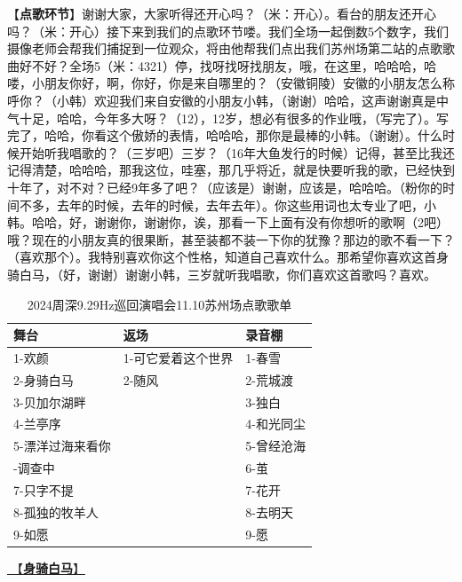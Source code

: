 \documentclass[]{ctexbook}
\begin{document}
【\textbf{点歌环节}】谢谢大家，大家听得还开心吗？（米：开心）。看台的朋友还开心吗？（米：开心）接下来到我们的点歌环节喽。我们全场一起倒数5个数字，我们摄像老师会帮我们捕捉到一位观众，将由他帮我们点出我们苏州场第二站的点歌歌曲好不好？全场5（米：4321）停，找呀找呀找朋友，哦，在这里，哈哈哈，哈喽，小朋友你好，啊，你好，你是来自哪里的？（安徽铜陵）安徽的小朋友怎么称呼你？（小韩）欢迎我们来自安徽的小朋友小韩，（谢谢）哈哈，这声谢谢真是中气十足，哈哈，今年多大呀？（12），12岁，想必有很多的作业哦，（写完了）。写完了，哈哈，你看这个傲娇的表情，哈哈哈，那你是最棒的小韩。（谢谢）。什么时候开始听我唱歌的？（三岁吧）三岁？（16年大鱼发行的时候）记得，甚至比我还记得清楚，哈哈哈，那我这位，哇塞，那几乎将近，就是快要听我的歌，已经快到十年了，对不对？已经9年多了吧？（应该是）谢谢，应该是，哈哈哈。（粉你的时间不多，去年的时候，去年的时候，去年去年）。你这些用词也太专业了吧，小韩。哈哈，好，谢谢你，谢谢你，诶，那看一下上面有没有你想听的歌啊（2吧）哦？现在的小朋友真的很果断，甚至装都不装一下你的犹豫？那边的歌不看一下？（喜欢那个）。我特别喜欢你这个性格，知道自己喜欢什么。那希望你喜欢这首身骑白马，（好，谢谢）谢谢小韩，三岁就听我唱歌，你们喜欢这首歌吗？喜欢。

\begin{table}

\caption{\label{tab:unnamed-chunk-135}2024周深9.29Hz巡回演唱会11.10苏州场点歌歌单}
\centering
\begin{tabular}[t]{lll}
\toprule
舞台 & 返场 & 录音棚\\
\midrule
1-欢颜 & 1-可它爱着这个世界 & 1-春雪\\
2-身骑白马 & 2-随风 & 2-荒城渡\\
3-贝加尔湖畔 &  & 3-独白\\
4-兰亭序 &  & 4-和光同尘\\
5-漂洋过海来看你 &  & 5-曾经沧海\\
\addlinespace
6-调查中 &  & 6-茧\\
7-只字不提 &  & 7-花开\\
8-孤独的牧羊人 &  & 8-去明天\\
9-如愿 &  & 9-愿\\
\bottomrule
\end{tabular}
\end{table}

\hyperref[on-the-white-horse]{🎵【\textbf{身骑白马}】}
\end{document}
